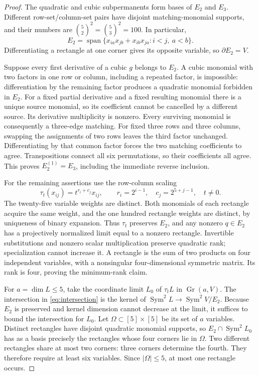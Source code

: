 \documentclass[11pt]{amsart}
\theoremstyle{remark}
\numberwithin{equation}{section}
\newcommand{\Sym}{\operatorname{Sym}}
\newcommand{\Span}{\operatorname{span}}
\newcommand{\dd}{\partial}
\begin{document}
\begin{proof}
The quadratic and cubic subpermanents form bases of \(E_2\) and \(E_3\).
Different row-set/column-set pairs have disjoint matching-monomial supports,
and their numbers are \(\binom52^2=\binom53^2=100\).
In particular,
\[
 E_2=\Span\{x_{ia}x_{jb}+x_{ib}x_{ja}:i<j,\ a<b\}.
\]
Differentiating a rectangle at one corner gives its opposite variable,
so \(\dd E_2=V\).

Suppose every first derivative of a cubic \(g\) belongs to \(E_2\).
A cubic monomial with two factors in one row or column, including a
repeated factor, is impossible: differentiation by the remaining factor
produces a quadratic monomial forbidden in \(E_2\). For a fixed
partial derivative and a fixed resulting monomial there is a unique
source monomial, so its coefficient cannot be cancelled by a different
source. Its derivative multiplicity is nonzero. Every surviving monomial
is consequently a three-edge matching. For fixed three rows and three
columns, swapping the assignments of two rows leaves the third factor
unchanged. Differentiating by that common factor forces the two matching
coefficients to agree. Transpositions connect all six permutations,
so their coefficients all agree. This proves \(E_2^{(1)}=E_3\), including
the immediate reverse inclusion.

For the remaining assertions use the row-column scaling
\begin{equation}\label{eq:row-column}
 \tau_t(x_{ij})=t^{r_i+c_j}x_{ij},\qquad
 r_i=2^{i-1},\quad c_j=2^{5+j-1},\quad t\ne0.
\end{equation}
The twenty-five variable weights are distinct. Both monomials of each
rectangle acquire the same weight, and the one hundred rectangle weights
are distinct, by uniqueness of binary expansion. Thus \(\tau_t\)
preserves \(E_2\), and any nonzero \(q\in E_2\) has a projectively
normalized limit equal to a nonzero rectangle. Invertible substitutions
and nonzero scalar multiplication preserve quadratic rank; specialization
cannot increase it. A rectangle is the sum of two products on four
independent variables, with a nonsingular four-dimensional symmetric
matrix. Its rank is four, proving the minimum-rank claim.

For \(a=\dim L\le5\), take the coordinate limit \(L_0\) of
\(\tau_tL\) in \(\operatorname{Gr}(a,V)\). The intersection in
\eqref{eq:intersection} is the kernel of
\(\Sym^2L\to\Sym^2V/E_2\). Because \(E_2\) is preserved and kernel
dimension cannot decrease at the limit, it suffices to bound the
intersection for \(L_0\). Let \(\Omega\subset[5]\times[5]\) be its
set of \(a\) variables. Distinct rectangles have disjoint quadratic
monomial supports, so \(E_2\cap\Sym^2L_0\) has as a basis precisely
the rectangles whose four corners lie in \(\Omega\).
Two different rectangles share at most two corners: three corners
determine the fourth. They therefore require at least six variables.
Since \(|\Omega|\le5\), at most one rectangle occurs.
\end{proof}
\end{document}
